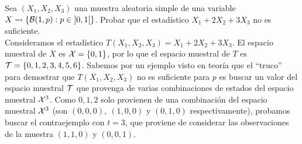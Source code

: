 \begin{ejercicio}
    Sea $(X_1, X_2, X_3)$ una muestra aleatoria simple de una variable $X\rightsquigarrow\{\mathcal{B}(1,p) : p \in \left]0,1\right[\}$. Probar que el estadístico $X_1 + 2X_2 + 3X_3$ no es suficiente.\\

    \noindent
    Consideramos el estadístico $T(X_1, X_2, X_3) = X_1 + 2X_2 + 3X_3$. El espacio muestral de $X$ es $\mathcal{X}=\{0,1\}$, por lo que el espacio muestral de $T$ es $\mathcal{T} = \{0, 1, 2, 3, 4, 5, 6\}$. Sabemos por un ejemplo visto en teoría que el ``truco'' para demostrar que $T(X_1, X_2,X_3)$ no es suficiente para $p$ es buscar un valor del espacio muestral $\mathcal{T}$ que provenga de varias combinaciones de estados del espacio muestral $\mathcal{X}^3$. Como $0,1,2$ solo provienen de una combinación del espacio muestral $\mathcal{X}^3$ (son $(0,0,0),\ (1,0,0)$ y $(0,1,0)$ respectivamente), probamos buscar el contraejemplo con $t=3$, que proviene de considerar las observaciones de la muestra $(1,1,0)$ y $(0,0,1)$.


\end{ejercicio}

